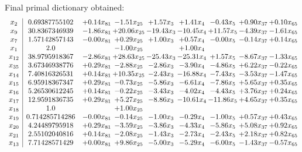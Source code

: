 \documentclass[8pt]{article}
\begin{document}
 Final primal dictionary obtained: 
\[\begin{array}{c| c c@{\hskip 2pt} c@{\hskip 2pt} c@{\hskip 2pt} c@{\hskip 2pt} c@{\hskip 2pt} c@{\hskip 2pt} c@{\hskip 2pt} }
 x_{2}   &  0.69387755102 & +  0.14 x_{81} & -1.51 x_{25} & +  1.57 x_{3} & +  1.41 x_{4} & -0.43 x_{5} & +  0.90 x_{37} & +  0.10 x_{65}\\
 x_{9}   &  30.8367346939 & -1.86 x_{81} & + 20.06 x_{25} & -19.43 x_{3} & -10.45 x_{4} & + 11.57 x_{5} & -4.39 x_{37} & -1.61 x_{65}\\
 x_{7}   &  1.57142857143 & -0.00 x_{81} & +  0.29 x_{25} & +  1.00 x_{3} & +  0.57 x_{4} & -0.00 x_{5} & -0.14 x_{37} & +  0.14 x_{65}\\
 x_{1}   &  2.0  &   & -1.00 x_{25} &   & +  1.00 x_{4} &    &    &   \\
 x_{12}   &  38.9795918367 & -2.86 x_{81} & + 28.63 x_{25} & -25.43 x_{3} & -25.31 x_{4} & +  1.57 x_{5} & -8.67 x_{37} & -1.33 x_{65}\\
 x_{35}   &  3.67346938776 & +  0.29 x_{81} & -2.88 x_{25} & -2.86 x_{3} & -3.90 x_{4} & -4.86 x_{5} & +  6.22 x_{37} & -0.22 x_{65}\\
 x_{14}   &  7.40816326531 & +  0.14 x_{81} & + 10.35 x_{25} & -2.43 x_{3} & -16.88 x_{4} & -7.43 x_{5} & -3.53 x_{37} & -1.47 x_{65}\\
 x_{15}   &  6.95918367347 & +  0.29 x_{81} & -0.73 x_{25} & -5.86 x_{3} & -6.61 x_{4} & -7.86 x_{5} & +  5.65 x_{37} & +  0.35 x_{65}\\
 x_{16}   &  5.26530612245 & +  0.14 x_{81} & -0.22 x_{25} & -3.43 x_{3} & -4.02 x_{4} & -4.43 x_{5} & +  3.76 x_{37} & +  0.24 x_{65}\\
 x_{17}   &  12.9591836735 & +  0.29 x_{81} & +  5.27 x_{25} & -8.86 x_{3} & -10.61 x_{4} & -11.86 x_{5} & +  4.65 x_{37} & +  0.35 x_{65}\\
 x_{18}   &  1.0  &   & +  1.00 x_{25} &    &    &    &    &   \\
 x_{19}   &  0.714285714286 & -0.00 x_{81} & -0.14 x_{25} & -1.00 x_{3} & -0.29 x_{4} & -1.00 x_{5} & +  0.57 x_{37} & +  0.43 x_{65}\\
 x_{20}   &  4.24489795918 & +  0.29 x_{81} & -3.59 x_{25} & -3.86 x_{3} & -4.33 x_{4} & -5.86 x_{5} & +  5.08 x_{37} & +  0.92 x_{65}\\
 x_{21}   &  2.55102040816 & +  0.14 x_{81} & -2.08 x_{25} & -1.43 x_{3} & -2.73 x_{4} & -2.43 x_{5} & +  2.18 x_{37} & +  0.82 x_{65}\\
 x_{13}   &  7.71428571429 & +  0.00 x_{81} & +  9.86 x_{25} & -5.00 x_{3} & -5.29 x_{4} & -6.00 x_{5} & -1.43 x_{37} & -0.57 x_{65}\\

\end{array}\]
\end{document}
